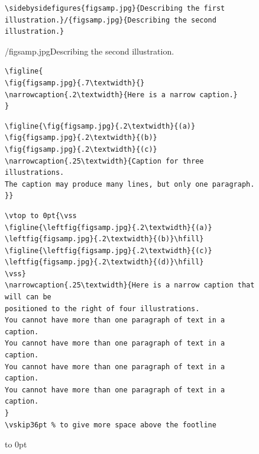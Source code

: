 \documentclass[preprint]{JASA}
\begin{document}
\begin{figure}
\baselineskip=12pt
\begin{verbatim}
\sidebysidefigures{figsamp.jpg}{Describing the first
illustration.}/{figsamp.jpg}{Describing the second illustration.}
\end{verbatim}

/{figsamp.jpg}{Describing the second illustration.}
\end{figure}


\begin{figure}
\baselineskip=12pt
\begin{verbatim}
\figline{
\fig{figsamp.jpg}{.7\textwidth}{}
\narrowcaption{.2\textwidth}{Here is a narrow caption.}
}
\end{verbatim}
\end{figure}


\begin{figure}
\baselineskip=12pt
\begin{verbatim}
\figline{\fig{figsamp.jpg}{.2\textwidth}{(a)}
\fig{figsamp.jpg}{.2\textwidth}{(b)}
\fig{figsamp.jpg}{.2\textwidth}{(c)}
\narrowcaption{.25\textwidth}{Caption for three illustrations. 
The caption may produce many lines, but only one paragraph.
}}
\end{verbatim}
\end{figure}


\begin{figure}
\baselineskip=12pt
\begin{verbatim}
\vtop to 0pt{\vss
\figline{\leftfig{figsamp.jpg}{.2\textwidth}{(a)}
\leftfig{figsamp.jpg}{.2\textwidth}{(b)}\hfill}
\figline{\leftfig{figsamp.jpg}{.2\textwidth}{(c)}
\leftfig{figsamp.jpg}{.2\textwidth}{(d)}\hfill}
\vss}
\narrowcaption{.25\textwidth}{Here is a narrow caption that will can be
positioned to the right of four illustrations.
You cannot have more than one paragraph of text in a caption.
You cannot have more than one paragraph of text in a caption.
You cannot have more than one paragraph of text in a caption.
You cannot have more than one paragraph of text in a caption.
}
\vskip36pt % to give more space above the footline
\end{verbatim}
\vskip1.3in
\vtop to 0pt{\vss
{}
\vss}
\vskip36pt
\end{figure}
\end{document}
